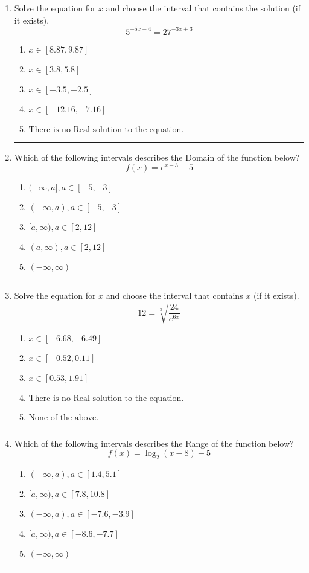 \documentclass[14pt]{extbook}
\newcommand{\litem}[1]{\item#1\hspace*{-1cm}\rule{\textwidth}{0.4pt}}
\begin{document}
\begin{enumerate}
{\begin{enumerate}[label=\Alph*.]
\end{enumerate} }
\litem{
Solve the equation for $x$ and choose the interval that contains the solution (if it exists).\[ 5^{-5x-4} = 27^{-3x+3} \]\begin{enumerate}[label=\Alph*.]
\item \( x \in [8.87, 9.87] \)
\item \( x \in [3.8, 5.8] \)
\item \( x \in [-3.5, -2.5] \)
\item \( x \in [-12.16, -7.16] \)
\item \( \text{There is no Real solution to the equation.} \)

\end{enumerate} }
\litem{
Which of the following intervals describes the Domain of the function below?\[ f(x) = e^{x-3}-5 \]\begin{enumerate}[label=\Alph*.]
\item \( (-\infty, a], a \in [-5, -3] \)
\item \( (-\infty, a), a \in [-5, -3] \)
\item \( [a, \infty), a \in [2, 12] \)
\item \( (a, \infty), a \in [2, 12] \)
\item \( (-\infty, \infty) \)

\end{enumerate} }
\litem{
 Solve the equation for $x$ and choose the interval that contains $x$ (if it exists).\[  12 = \sqrt[3]{\frac{24}{e^{6x}}} \]\begin{enumerate}[label=\Alph*.]
\item \( x \in [-6.68, -6.49] \)
\item \( x \in [-0.52, 0.11] \)
\item \( x \in [0.53, 1.91] \)
\item \( \text{There is no Real solution to the equation.} \)
\item \( \text{None of the above.} \)

\end{enumerate} }
\litem{
Which of the following intervals describes the Range of the function below?\[ f(x) = \log_2{(x-8)}-5 \]\begin{enumerate}[label=\Alph*.]
\item \( (-\infty, a), a \in [1.4, 5.1] \)
\item \( [a, \infty), a \in [7.8, 10.8] \)
\item \( (-\infty, a), a \in [-7.6, -3.9] \)
\item \( [a, \infty), a \in [-8.6, -7.7] \)
\item \( (-\infty, \infty) \)


\end{enumerate}}
\end{enumerate}
\end{document}

